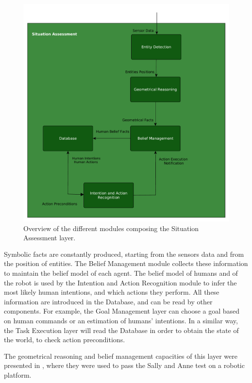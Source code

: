  \begin{figure}[ht!]
	\centering
	\includegraphics[scale=0.45]{img/observer/situation_assessment_overview.pdf}
	\caption{Overview of the different modules composing the Situation Assessment layer.}
	\label{fig:belief_management-belief_management_overview}
\end{figure}

Symbolic facts are constantly produced, starting from the sensors data and from the position of entities. The Belief Management module collects these information to maintain the belief model of each agent. The belief model of humans and of the robot is used by the Intention and Action Recognition module to infer the most likely human intentions, and which actions they perform. All these information are introduced in the Database, and can be read by other components. For example, the Goal Management layer can choose a goal based on human commands or an estimation of humans' intentions. In a similar way, the Task Execution layer will read the Database in order to obtain the state of the world, to check action preconditions.  

The geometrical reasoning and belief management capacities of this layer were presented in \cite{Milliez2014}, where they were used to pass the Sally and Anne test on a robotic platform. 

